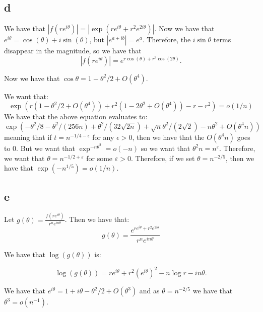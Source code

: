 \documentclass[]{article}
\begin{document}
\subsection{d}
We have that $|f(r e^{i \theta})| = |\exp\left(r e^{i \theta} + r^2 e^{2 i \theta}\right)|$. Now we have that $e^{i \theta} = \cos(\theta) + i \sin (\theta)$, but $|e^{a + ib}| = e^a$. Therefore, the $i \sin \theta$ terms disappear in the magnitude, so we have that 
\begin{equation}
	|f(r e^{i \theta})| = e^{r \cos (\theta) + r^2 \cos (2 \theta)}. 
\end{equation}

Now we have that $\cos \theta = 1 - \theta^2/2 + O(\theta^4)$. 

We want that:
\begin{equation}
	\exp(r (1 - \theta^2/2 + O(\theta^4)) + r^2 (1 - 2 \theta^2 + O(\theta^4)) - r - r^2) = o(1/n)
\end{equation}
We have that the above equation evaluates to:
\begin{equation}
	\exp(
	-\theta^2/8 - \theta^2/(256n) + \theta^2/(32 \sqrt{2n}) + \sqrt{n} \theta^2/(2 \sqrt{2}) - n \theta^2 + O(\theta^4 n)
	)
\end{equation}
meaning that if $t = n^{-1/4 - \epsilon}$ for any $\epsilon > 0$, then we have that the $O(\theta^4 n)$ goes to 0. But we want that $\exp^{- n \theta^2} = o(-n)$ so we want that $\theta^2 n = n^\varepsilon$. Therefore, we want that $\theta = n^{-1/2 + \varepsilon}$ for some $\varepsilon > 0$. Therefore, if we set $\theta = n^{-2/5}$, then we have that $\exp(-n^{1/5}) = o(1/n)$.

\subsection{e}

Let $g(\theta) = \frac{f(r e^{i \theta})}{r^n e^{i n \theta}}$. Then we have that:
\begin{equation}
	g(\theta) = \frac{ e^{r e^{i \theta} + r^2 e^{2 i \theta}}}{r^n e^{i n \theta}}
\end{equation}

We have that $\log(g (\theta))$ is:

\begin{equation}
	\log(g(\theta)) = r e^{i \theta} + r^2 (e^{i \theta})^2 - n \log r - i n \theta.
\end{equation}

We have that $e^{i \theta} = 1 + i \theta - \theta^2/2  + O(\theta^3)$ and as $\theta = n^{-2/5}$ we have that $\theta^3 = o(n^{-1})$.
\end{document}
